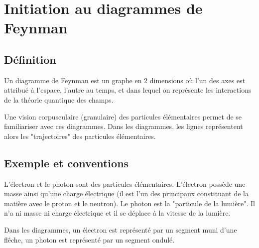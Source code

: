 

\section{Initiation au diagrammes de Feynman}


\label{JeanLucDeziel}

\subsection{Définition}

Un diagramme de Feynman est un graphe en 2 dimensions où l'un des axes est attribué à l'espace, l'autre au temps, et dans lequel on représente les interactions de la théorie quantique des champs. 



Une vision corpusculaire (granulaire) des particules élémentaires permet de se familiariser avec ces diagrammes. Dans les diagrammes, les lignes représentent alors les "trajectoires" des particules élémentaires.


\subsection{Exemple et conventions}

L'électron et le photon sont des particules élémentaires. L'électron possède une masse ainsi qu'une charge électrique (il est l'un des principaux constituant de la matière avec le proton et le neutron). Le photon est la "particule de la lumière". Il n'a ni masse ni charge électrique et il se déplace à la vitesse de la lumière.


Dans les diagrammes, un électron est représenté par un segment muni d'une flêche, un photon est représenté par un segment ondulé.

